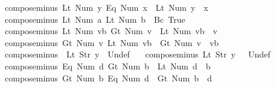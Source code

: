 \begin{isabellebody}
\ \ {\isachardoublequoteopen}compose{\isacharunderscore}minus\ {\isacharparenleft}Lt\ {\isacharparenleft}Num\ y{\isacharparenright}{\isacharparenright}\ {\isacharparenleft}Eq\ {\isacharparenleft}Num\ x{\isacharparenright}{\isacharparenright}\ {\isacharequal}\ Lt\ {\isacharparenleft}Num\ {\isacharparenleft}y\ {\isacharminus}\ x{\isacharparenright}{\isacharparenright}{\isachardoublequoteclose}\ {\isacharbar}\isanewline
\ \ {\isachardoublequoteopen}compose{\isacharunderscore}minus\ {\isacharparenleft}Lt\ {\isacharparenleft}Num\ a{\isacharparenright}{\isacharparenright}\ {\isacharparenleft}Lt\ {\isacharparenleft}Num\ b{\isacharparenright}{\isacharparenright}\ {\isacharequal}\ Bc\ True{\isachardoublequoteclose}\ {\isacharbar}\isanewline
\ \ {\isachardoublequoteopen}compose{\isacharunderscore}minus\ {\isacharparenleft}Lt\ {\isacharparenleft}Num\ vb{\isacharparenright}{\isacharparenright}\ {\isacharparenleft}Gt\ {\isacharparenleft}Num\ v{\isacharparenright}{\isacharparenright}\ {\isacharequal}\ Lt\ {\isacharparenleft}Num\ {\isacharparenleft}vb\ {\isacharminus}\ v{\isacharparenright}{\isacharparenright}{\isachardoublequoteclose}\ {\isacharbar}\isanewline
\ \ {\isachardoublequoteopen}compose{\isacharunderscore}minus\ {\isacharparenleft}Gt\ {\isacharparenleft}Num\ v{\isacharparenright}{\isacharparenright}\ {\isacharparenleft}Lt\ {\isacharparenleft}Num\ vb{\isacharparenright}{\isacharparenright}\ {\isacharequal}\ Gt\ {\isacharparenleft}Num\ {\isacharparenleft}v\ {\isacharminus}\ vb{\isacharparenright}{\isacharparenright}{\isachardoublequoteclose}\ {\isacharbar}\isanewline
\ \ {\isachardoublequoteopen}compose{\isacharunderscore}minus\ {\isacharunderscore}\ {\isacharparenleft}Lt\ {\isacharparenleft}Str\ y{\isacharparenright}{\isacharparenright}\ {\isacharequal}\ Undef{\isachardoublequoteclose}\ {\isacharbar}\isanewline
\ \ {\isachardoublequoteopen}compose{\isacharunderscore}minus\ {\isacharparenleft}Lt\ {\isacharparenleft}Str\ y{\isacharparenright}{\isacharparenright}\ {\isacharunderscore}\ {\isacharequal}\ Undef{\isachardoublequoteclose}\ {\isacharbar}\isanewline
\ \ {\isachardoublequoteopen}compose{\isacharunderscore}minus\ {\isacharparenleft}Eq\ {\isacharparenleft}Num\ d{\isacharparenright}{\isacharparenright}\ {\isacharparenleft}Gt\ {\isacharparenleft}Num\ b{\isacharparenright}{\isacharparenright}\ {\isacharequal}\ Lt\ {\isacharparenleft}Num\ {\isacharparenleft}d\ {\isacharminus}\ b{\isacharparenright}{\isacharparenright}{\isachardoublequoteclose}\ {\isacharbar}\isanewline
\ \ {\isachardoublequoteopen}compose{\isacharunderscore}minus\ {\isacharparenleft}Gt\ {\isacharparenleft}Num\ b{\isacharparenright}{\isacharparenright}\ {\isacharparenleft}Eq\ {\isacharparenleft}Num\ d{\isacharparenright}{\isacharparenright}\ {\isacharequal}\ Gt\ {\isacharparenleft}Num\ {\isacharparenleft}b\ {\isacharminus}\ d{\isacharparenright}{\isacharparenright}{\isachardoublequoteclose}\ {\isacharbar}\isanewline

\end{isabellebody}
